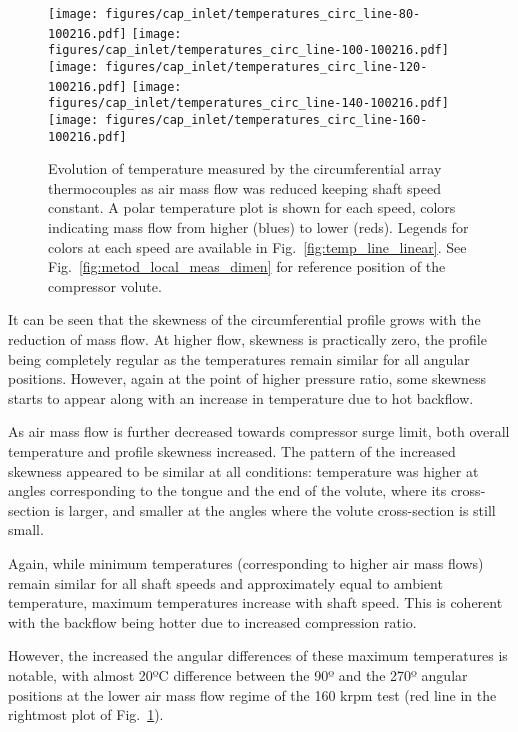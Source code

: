 \begin{figure}[t!]
\centering
\texttt{[image: figures/cap\_inlet/temperatures\_circ\_line-80-100216.pdf]}
\texttt{[image: figures/cap\_inlet/temperatures\_circ\_line-100-100216.pdf]}
\texttt{[image: figures/cap\_inlet/temperatures\_circ\_line-120-100216.pdf]}
\texttt{[image: figures/cap\_inlet/temperatures\_circ\_line-140-100216.pdf]}
\texttt{[image: figures/cap\_inlet/temperatures\_circ\_line-160-100216.pdf]}
\caption[Circumferential temperature distributions]{Evolution of temperature measured by the circumferential array thermocouples as air mass flow was reduced keeping shaft speed constant. A polar temperature plot is shown for each speed, colors indicating mass flow from higher (blues) to lower (reds). Legends for colors at each speed are available in Fig.~\ref{fig:temp_line_linear}. See Fig.~\ref{fig:metod_local_meas_dimen} for reference position of the compressor volute.}
\label{fig:temp_circ_all}
\end{figure}

It can be seen that the skewness of the circumferential profile grows with the reduction of mass flow. At higher flow, skewness is practically zero, the profile being completely regular as the temperatures remain similar for all angular positions. However, again at the point of higher pressure ratio, some skewness starts to appear along with an increase in temperature due to hot backflow.

As air mass flow is further decreased towards compressor surge limit, both overall temperature and profile skewness increased. The pattern of the increased skewness appeared to be similar at all conditions: temperature was higher at angles corresponding to the tongue and the end of the volute, where its cross-section is larger, and smaller at the angles where the volute cross-section is still small.

Again, while minimum temperatures (corresponding to higher air mass flows) remain similar for all shaft speeds and approximately equal to ambient temperature, maximum temperatures increase with shaft speed. This is coherent with the backflow being hotter due to increased compression ratio.

However, the increased the angular differences of these maximum temperatures is notable, with almost 20ºC difference between the 90º and the 270º angular positions at the lower air mass flow regime of the 160 krpm test (red line in the rightmost plot of Fig.~\ref{fig:temp_circ_all}).


